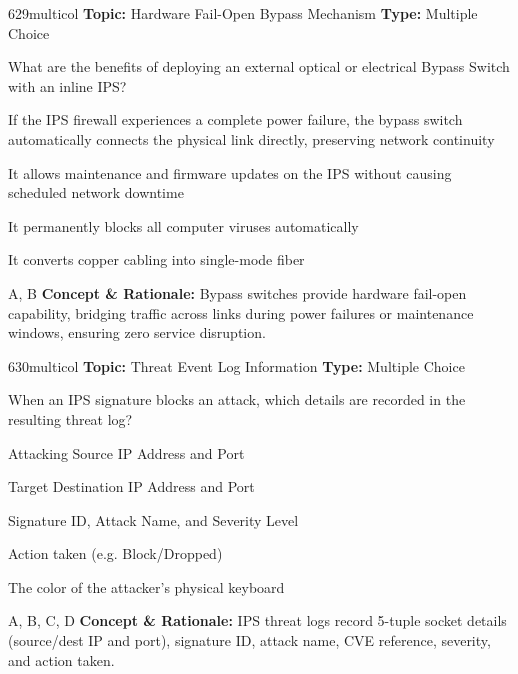 \begin{qcard}{629}{multicol}
\textcolor{darkslate!75}{\small\textbf{Topic:} Hardware Fail-Open Bypass Mechanism \hfill \textbf{Type:} Multiple Choice}\vspace{0.4em}\par
What are the benefits of deploying an external optical or electrical Bypass Switch with an inline IPS?
\begin{qoptions}
\item If the IPS firewall experiences a complete power failure, the bypass switch automatically connects the physical link directly, preserving network continuity
\item It allows maintenance and firmware updates on the IPS without causing scheduled network downtime
\item It permanently blocks all computer viruses automatically
\item It converts copper cabling into single-mode fiber
\end{qoptions}
\end{qcard}
\nopagebreak
\begin{explainbox}{A, B}
\textbf{Concept \& Rationale:} Bypass switches provide hardware fail-open capability, bridging traffic across links during power failures or maintenance windows, ensuring zero service disruption.
\end{explainbox}

\begin{qcard}{630}{multicol}
\textcolor{darkslate!75}{\small\textbf{Topic:} Threat Event Log Information \hfill \textbf{Type:} Multiple Choice}\vspace{0.4em}\par
When an IPS signature blocks an attack, which details are recorded in the resulting threat log?
\begin{qoptions}
\item Attacking Source IP Address and Port
\item Target Destination IP Address and Port
\item Signature ID, Attack Name, and Severity Level
\item Action taken (e.g. Block/Dropped)
\item The color of the attacker's physical keyboard
\end{qoptions}
\end{qcard}
\nopagebreak
\begin{explainbox}{A, B, C, D}
\textbf{Concept \& Rationale:} IPS threat logs record 5-tuple socket details (source/dest IP and port), signature ID, attack name, CVE reference, severity, and action taken.
\end{explainbox}

